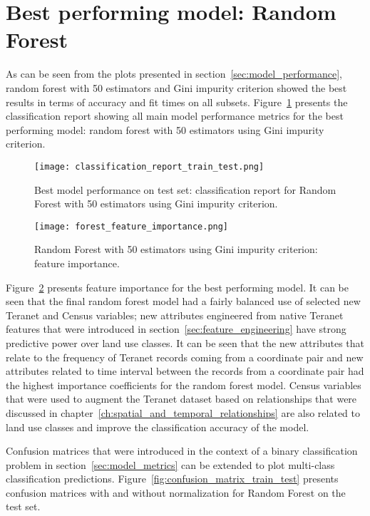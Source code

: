 \section{Best performing model: Random Forest} \label{sec:best_performing_model}

As can be seen from the plots presented in section~\ref{sec:model_performance}, random forest with 50 estimators and Gini impurity criterion showed the best results in terms of accuracy and fit times on all subsets.
Figure~\ref{fig:classification_report_train_test} presents the classification report showing all main model performance metrics for the best performing model: random forest with 50 estimators using Gini impurity criterion.

\begin{figure}[hbt!]
    \centering
    \texttt{[image: classification\_report\_train\_test.png]}
    \caption{Best model performance on test set: classification report for Random Forest with 50 estimators using Gini impurity criterion.}
    \label{fig:classification_report_train_test}
\end{figure}

\begin{figure}[hbt!]
    \centering
    \texttt{[image: forest\_feature\_importance.png]}
    \caption{Random Forest with 50 estimators using Gini impurity criterion: feature importance.}
    \label{fig:forest_feature_importance}
\end{figure}

Figure~\ref{fig:forest_feature_importance} presents feature importance for the best performing model.
It can be seen that the final random forest model had a fairly balanced use of selected new Teranet and Census variables;
new attributes engineered from native Teranet features that were introduced in section~\ref{sec:feature_engineering} have strong predictive power over land use classes.
It can be seen that the new attributes that relate to the frequency of Teranet records coming from a coordinate pair and new attributes related to time interval between the records from a coordinate pair had the highest importance coefficients for the random forest model.
Census variables that were used to augment the Teranet dataset based on relationships that were discussed in chapter~\ref{ch:spatial_and_temporal_relationships} are also related to land use classes and improve the classification accuracy of the model.

Confusion matrices that were introduced in the context of a binary classification problem in section~\ref{sec:model_metrics} can be extended to plot multi-class classification predictions.
Figure~\ref{fig:confusion_matrix_train_test} presents confusion matrices with and without normalization for Random Forest on the test set.

